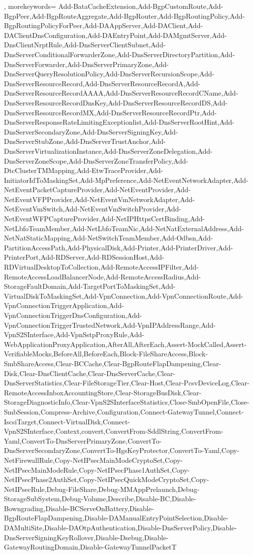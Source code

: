 {{	},
	morekeywords={
		Add-BataCacheExtension,Add-BgpCustomRoute,Add-BgpPeer,Add-BgpRouteAggregate,Add-BgpRouter,Add-BgpRoutingPolicy,Add-BgpRoutingPolicyForPeer,Add-DAAppServer,Add-DAClient,Add-DAClientDnsConfiguration,Add-DAEntryPoint,Add-DAMgmtServer,Add-DnsClientNrptRule,Add-DnsServerClientSubnet,Add-DnsServerConditionalForwarderZone,Add-DnsServerDirectoryPartition,Add-DnsServerForwarder,Add-DnsServerPrimaryZone,Add-DnsServerQueryResolutionPolicy,Add-DnsServerRecursionScope,Add-DnsServerResourceRecord,Add-DnsServerResourceRecordA,Add-DnsServerResourceRecordAAAA,Add-DnsServerResourceRecordCName,Add-DnsServerResourceRecordDnsKey,Add-DnsServerResourceRecordDS,Add-DnsServerResourceRecordMX,Add-DnsServerResourceRecordPtr,Add-DnsServerResponseRateLimitingExceptionlist,Add-DnsServerRootHint,Add-DnsServerSecondaryZone,Add-DnsServerSigningKey,Add-DnsServerStubZone,Add-DnsServerTrustAnchor,Add-DnsServerVirtualizationInstance,Add-DnsServerZoneDelegation,Add-DnsServerZoneScope,Add-DnsServerZoneTransferPolicy,Add-DtcClusterTMMapping,Add-EtwTraceProvider,Add-InitiatorIdToMaskingSet,Add-MpPreference,Add-NetEventNetworkAdapter,Add-NetEventPacketCaptureProvider,Add-NetEventProvider,Add-NetEventVFPProvider,Add-NetEventVmNetworkAdapter,Add-NetEventVmSwitch,Add-NetEventVmSwitchProvider,Add-NetEventWFPCaptureProvider,Add-NetIPHttpsCertBinding,Add-NetLbfoTeamMember,Add-NetLbfoTeamNic,Add-NetNatExternalAddress,Add-NetNatStaticMapping,Add-NetSwitchTeamMember,Add-Odbsn,Add-PartitionAccessPath,Add-PhysicalDisk,Add-Printer,Add-PrinterDriver,Add-PrinterPort,Add-RDServer,Add-RDSessionHost,Add-RDVirtualDesktopToCollection,Add-RemoteAccessIPFilter,Add-RemoteAccessLoadBalancerNode,Add-RemoteAccessRadius,Add-StorageFaultDomain,Add-TargetPortToMaskingSet,Add-VirtualDiskToMaskingSet,Add-VpnConnection,Add-VpnConnectionRoute,Add-VpnConnectionTriggerApplication,Add-VpnConnectionTriggerDnsConfiguration,Add-VpnConnectionTriggerTrustedNetwork,Add-VpnIPAddressRange,Add-VpnS2SInterface,Add-VpnSstpProxyRule,Add-WebApplicationProxyApplication,AfterAll,AfterEach,Assert-MockCalled,Assert-VerifiableMocks,BeforeAll,BeforeEach,Block-FileShareAccess,Block-SmbShareAccess,Clear-BCCache,Clear-BgpRouteFlapDampening,Clear-Disk,Clear-DnsClientCache,Clear-DnsServerCache,Clear-DnsServerStatistics,Clear-FileStorageTier,Clear-Host,Clear-PcsvDeviceLog,Clear-RemoteAccessInboxAccountingStore,Clear-StorageBusDisk,Clear-StorageDiagnosticInfo,Clear-VpnS2SInterfaceStatistics,Close-SmbOpenFile,Close-SmbSession,Compress-Archive,Configuration,Connect-GatewayTunnel,Connect-IscsiTarget,Connect-VirtualDisk,Connect-VpnS2SInterface,Context,convert,ConvertFrom-SddlString,ConvertFrom-Yaml,ConvertTo-DnsServerPrimaryZone,ConvertTo-DnsServerSecondaryZone,ConvertTo-HgsKeyProtector,ConvertTo-Yaml,Copy-NetFirewallRule,Copy-NetIPsecMainModeCryptoSet,Copy-NetIPsecMainModeRule,Copy-NetIPsecPhase1AuthSet,Copy-NetIPsecPhase2AuthSet,Copy-NetIPsecQuickModeCryptoSet,Copy-NetIPsecRule,Debug-FileShare,Debug-MMAppPrelaunch,Debug-StorageSubSystem,Debug-Volume,Describe,Disable-BC,Disable-Bowngrading,Disable-BCServeOnBattery,Disable-BgpRouteFlapDampening,Disable-DAManualEntryPointSelection,Disable-DAMultiSite,Disable-DAOtpAuthentication,Disable-DnsServerPolicy,Disable-DnsServerSigningKeyRollover,Disable-Dsebug,Disable-GatewayRoutingDomain,Disable-GatewayTunnelPacketT}}
